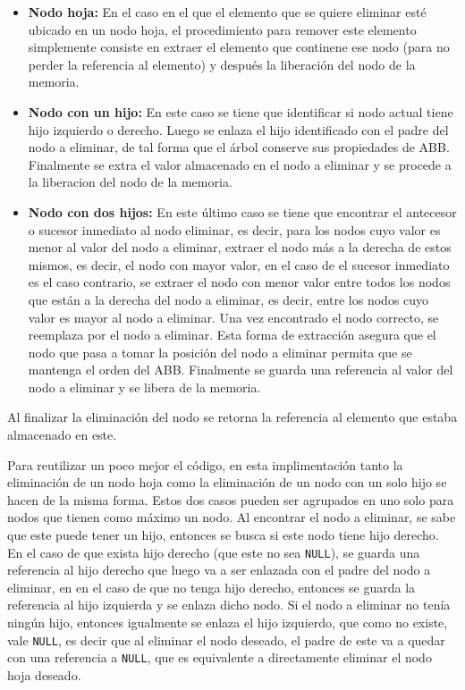 \documentclass[titlepage,a4paper]{article}
\begin{document}
\begin{itemize}
	\item \textbf{Nodo hoja:} En el caso en el que el elemento que
			se quiere eliminar esté ubicado en un nodo hoja, el procedimiento para
			remover este elemento simplemente consiste en extraer el elemento que
			continene ese nodo (para no perder la referencia al elemento) y después
			la liberación del nodo de la memoria.
		\item \textbf{Nodo con un hijo:} En este caso se tiene que identificar si
			nodo actual tiene hijo izquierdo o derecho. Luego se enlaza el hijo
			identificado con el padre del nodo a eliminar, de tal forma que el árbol
			conserve sus propiedades de ABB. Finalmente se extra el valor almacenado
			en el nodo a eliminar y se procede a la liberacion del nodo de la memoria.
		\item \textbf{Nodo con dos hijos:} En este último caso se tiene que
			encontrar el antecesor o sucesor inmediato al nodo eliminar, es decir,
			para los nodos cuyo valor es menor al valor del nodo a eliminar, extraer
			el nodo más a la derecha de estos mismos, es decir, el nodo con mayor
			valor, en el caso de el sucesor inmediato es el caso contrario, se
			extraer el nodo con menor valor entre todos los nodos que están a la
			derecha del nodo a eliminar, es decir, entre los nodos cuyo valor es mayor
			al nodo a eliminar. Una vez encontrado el nodo correcto, se reemplaza
			por el nodo a eliminar. Esta forma de extracción asegura que el nodo que
			pasa a tomar la posición del nodo a eliminar permita que se mantenga el
			orden del ABB. Finalmente se guarda una referencia al valor del nodo a
			eliminar y se libera de la memoria.
\end{itemize}

Al finalizar la eliminación del nodo se retorna la referencia al elemento que
estaba almacenado en este.

Para reutilizar un poco mejor el código, en esta implimentación tanto la
eliminación de un nodo hoja como la eliminación de un nodo con un solo hijo se
hacen de la misma forma. Estos dos casos pueden ser agrupados en uno solo para
nodos que tienen como máximo un nodo. Al encontrar el nodo a eliminar, se sabe
que este puede tener un hijo, entonces se busca si este nodo tiene hijo derecho.
En el caso de que exista hijo derecho (que este no sea \lstinline{NULL}), se
guarda una referencia al hijo derecho que luego va a ser enlazada con el padre
del nodo a eliminar, en en el caso de que no tenga hijo derecho, entonces se 
guarda la referencia al hijo izquierda y se enlaza dicho nodo. Si el nodo a
eliminar no tenía ningún hijo, entonces igualmente se enlaza el hijo izquierdo,
que como no existe, vale \lstinline{NULL}, es decir que al eliminar el nodo
deseado, el padre de este va a quedar con una referencia a \lstinline{NULL},
que es equivalente a directamente eliminar el nodo hoja deseado.
\end{document}
